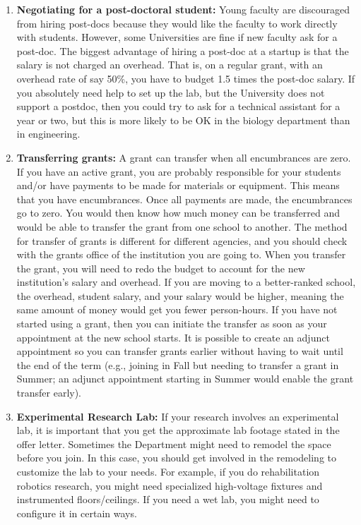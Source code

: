 \documentclass[14pt]{article}
\begin{document}
\begin{enumerate}
\item {\bf Negotiating for a post-doctoral student:} Young faculty are discouraged from hiring post-docs because they would like the faculty to work directly with students. However, some Universities are fine if new faculty ask for a post-doc. The biggest advantage of hiring a post-doc at a startup is that the salary is not charged an overhead. That is, on a regular grant, with an overhead rate of say 50\%, you have to budget 1.5 times the post-doc salary. If you absolutely need help to set up the lab, but the University does not support a postdoc, then you could try to ask for a technical assistant for a year or two, but this is more likely to be OK in the biology department than in engineering. 
\item {\bf Transferring grants:} A grant can transfer when all encumbrances are zero. If you have an active grant, you are probably responsible for your students and/or have payments to be made for materials or equipment. This means that you have encumbrances. Once all payments are made, the encumbrances go to zero. You would then know how much money can be transferred and would be able to transfer the grant from one school to another. The method for transfer of grants is different for different agencies, and you should check with the grants office of the institution you are going to. When you transfer the grant, you will need to redo the budget to account for the new institution's salary and overhead. If you are moving to a better-ranked school, the overhead, student salary, and your salary would be higher, meaning the same amount of money would get you fewer person-hours. If you have not started using a grant, then you can initiate the transfer as soon as your appointment at the new school starts. It is possible to create an adjunct appointment so you can transfer grants earlier without having to wait until the end of the term (e.g., joining in Fall but needing to transfer a grant in Summer; an adjunct appointment starting in Summer would enable the grant transfer early).
\item {\bf Experimental Research Lab:} If your research involves an experimental lab, it is important that you get the approximate lab footage stated in the offer letter. Sometimes the Department might need to remodel the space before you join. In this case, you should get involved in the remodeling to customize the lab to your needs. For example, if you do rehabilitation robotics research, you might need specialized high-voltage fixtures and instrumented floors/ceilings. If you need a wet lab, you might need to configure it in certain ways. 

\end{enumerate}
\end{document}
